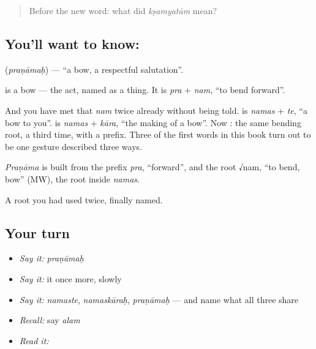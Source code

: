\begin{quote}
Before the new word: what did \emph{kṣamyatām} mean?
\end{quote}

\subsection*{You'll want to know: }
\textbf{} (\emph{praṇāmaḥ}) — \textquotedblleft{}a bow, a respectful salutation\textquotedblright{}.

\textbf{} is a bow — the act, named as a thing. It is \emph{pra} + \emph{nam}, \textquotedblleft{}to bend forward\textquotedblright{}.

And you have met that \emph{nam} twice already without being told. \textbf{} is \emph{namas} + \emph{te}, \textquotedblleft{}a bow to you\textquotedblright{}. \textbf{} is \emph{namas} + \emph{kāra}, \textquotedblleft{}the making of a bow\textquotedblright{}. Now : the same bending root, a third time, with a prefix. Three of the first words in this book turn out to be one gesture described three ways.

\begin{cousinweb}
\emph{Praṇāma} is built from the prefix \emph{pra}, \textquotedblleft{}forward\textquotedblright{}, and the root √nam, \textquotedblleft{}to bend, bow\textquotedblright{} (MW), the root inside \emph{namas}.
\end{cousinweb}

\begin{grammarlens}[title={What you've built}]
A root you had used twice, finally named.
\end{grammarlens}

\subsection*{Your turn}
\begin{itemize}
\raggedright
  \item \emph{Say it:} \emph{praṇāmaḥ}
  \item \emph{Say it:} it once more, slowly
  \item \emph{Say it:} \emph{namaste}, \emph{namaskāraḥ}, \emph{praṇāmaḥ} — and name what all three share
  \item \emph{Recall:} say \emph{alam}
  \item \emph{Read it:} \textbf{}
\end{itemize}

